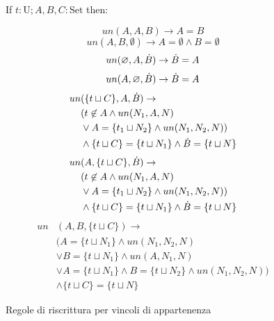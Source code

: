 \documentclass[12pt,a4paper,openright]{book}  %
\begin{document}
\begin{figure}
	\begin{tcolorbox}[colframe=black, colback=white, sharp corners]
		\setcounter{equation}{0}
		\renewcommand{\theequation}{$\cup$\textsubscript{\arabic{equation}}}

		If $t: \text{U}; A, B, C: \text{Set}$ then:

		\begin{equation}
		un(A,A,B) \to A = B
		\end{equation}
		\begin{equation}
		un(A,B,\emptyset) \to A = \emptyset \land B = \emptyset
		\end{equation}
		\begin{equation}
		un(\varnothing,A,\dot{B}) \to \dot{B} = A
		\end{equation}
		\begin{equation}
		un(A,\varnothing,\dot{B}) \to \dot{B} = A
		\end{equation}
		\begin{equation}
		\begin{split}
		un & (\{ t \sqcup C \}, A, \dot{B}) \to \\
		& (t \not\in A \land un(N_1, A, N) \\
		& \lor A = \{ t_1 \sqcup N_2 \} \land un(N_1, N_2, N) ) \\
		& \land \{ t\sqcup C \} = \{ t \sqcup N_1 \} \land \dot{B} = \{ t\sqcup N \}
		\end{split}
		\end{equation}
		\begin{equation}
		\begin{split}
		un & (A, \{ t \sqcup C \}, \dot{B}) \to \\
		& (t \not\in A \land un(N_1, A, N) \\
		& \lor A = \{ t_1 \sqcup N_2 \} \land un(N_1, N_2, N) ) \\
		& \land \{ t\sqcup C \} = \{ t \sqcup N_1 \} \land \dot{B} = \{ t\sqcup N \}
		\end{split}
		\end{equation}
		\begin{equation}
		\begin{split}
		un & (A, B, \{ t \sqcup C \}) \to \\
		& (A = \{t \sqcup N_1 \} \land un(N_1, N_2, N) \\
		& \lor B = \{ t \sqcup N_1 \} \land un(A, N_1, N) \\
		& \lor A = \{ t \sqcup N_1 \} \land B = \{ t \sqcup N_2 \} \land un(N_1, N_2, N) ) \\
		& \land \{ t \sqcup C \} = \{ t \sqcup N \}
		\end{split}
		\end{equation}

	\end{tcolorbox}

	\caption{Regole di riscrittura per vincoli di appartenenza}
	\label{fig:un_constraints}
\end{figure}
\end{document}
